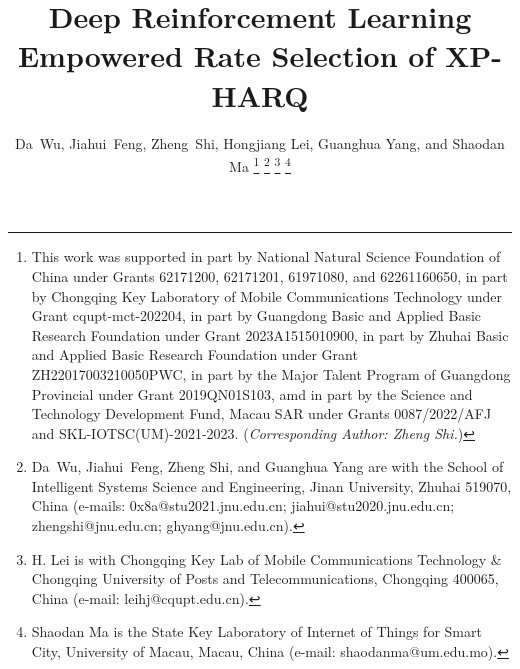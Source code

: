 \documentclass[lettersize,journal]{IEEEtran}
\begin{document}
\title{Deep Reinforcement Learning Empowered Rate Selection of XP-HARQ}
\author{Da~Wu,
        Jiahui~Feng,
        Zheng~Shi,
        Hongjiang Lei,
        Guanghua Yang,
        and Shaodan Ma
\thanks{This work was supported in part by National Natural Science Foundation of China under Grants 62171200, 62171201, 61971080, and 62261160650, in part by Chongqing Key Laboratory of Mobile Communications Technology under Grant cqupt-mct-202204, in part by Guangdong Basic and Applied Basic Research Foundation under Grant 2023A1515010900, in part by Zhuhai Basic and Applied Basic Research Foundation under Grant ZH22017003210050PWC, in part by the Major Talent Program of Guangdong Provincial under Grant 2019QN01S103, amd in part by the Science and Technology Development Fund, Macau SAR under Grants 0087/2022/AFJ and SKL-IOTSC(UM)-2021-2023. (\emph{Corresponding Author: Zheng Shi.})}
\thanks{Da~Wu, Jiahui~Feng, Zheng Shi, and Guanghua Yang are with the School of Intelligent Systems Science and Engineering, Jinan University, Zhuhai 519070, China (e-mails: 0x8a@stu2021.jnu.edu.cn; jiahui@stu2020.jnu.edu.cn; zhengshi@jnu.edu.cn; ghyang@jnu.edu.cn).}
\thanks{H. Lei is with Chongqing Key Lab of Mobile Communications Technology \& Chongqing University of Posts and Telecommunications, Chongqing 400065, China (e-mail: leihj@cqupt.edu.cn).}
\thanks{Shaodan Ma is the State Key Laboratory of Internet of Things for Smart City, University of Macau, Macau, China (e-mail: shaodanma@um.edu.mo).}
        }
\maketitle
\end{document}
